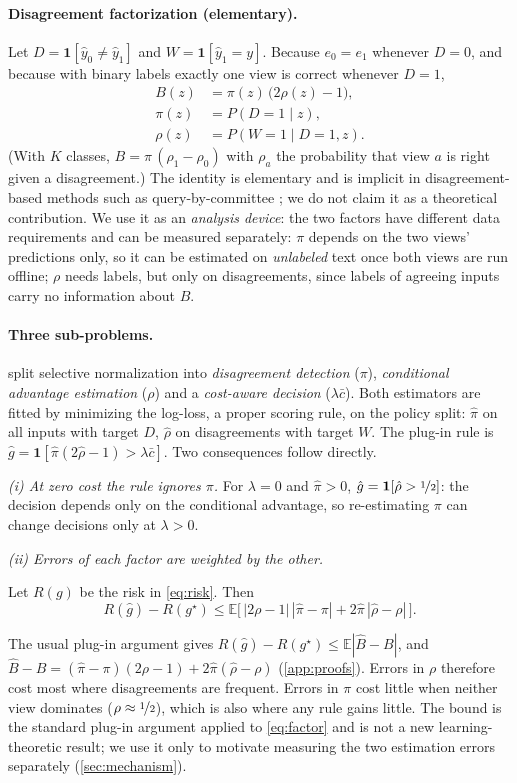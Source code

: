 \paragraph{Disagreement factorization (elementary).}
Let $D=\mathbf 1[\hat y_0\neq\hat y_1]$ and $W=\mathbf 1[\hat y_1=y]$.
Because $e_0=e_1$ whenever $D=0$, and because with binary labels exactly one view is correct whenever $D=1$,
\begin{align}
B(z)&=\pi(z)\,\big(2\rho(z)-1\big),\label{eq:factor}\\
\pi(z)&=P(D{=}1\mid z),\nonumber\\
\rho(z)&=P(W{=}1\mid D{=}1,z).\nonumber
\end{align}
(With $K$ classes, $B=\pi\,(\rho_1-\rho_0)$ with $\rho_a$ the probability that view $a$ is right given a disagreement.)
The identity is elementary and is implicit in disagreement-based methods such as query-by-committee \citep{seung1992qbc}; we do not claim it as a theoretical contribution. We use it as an \emph{analysis device}: the two factors have different data requirements and can be measured separately:
$\pi$ depends on the two views' predictions only, so it can be estimated on \emph{unlabeled} text once both views are run offline;
$\rho$ needs labels, but only on disagreements, since labels of agreeing inputs carry no information about $B$.

\paragraph{Three sub-problems.}
 split selective normalization into \emph{disagreement detection} ($\pi$), \emph{conditional advantage estimation} ($\rho$) and a \emph{cost-aware decision} ($\lambda\bar c$). Both estimators are fitted by minimizing the log-loss, a proper scoring rule, on the policy split: $\hat\pi$ on all inputs with target $D$, $\hat\rho$ on disagreements with target $W$. The plug-in rule is $\hat g=\mathbf 1[\hat\pi(2\hat\rho-1)>\lambda\bar c]$. Two consequences follow directly.

\emph{(i) At zero cost the rule ignores $\pi$.} For $\lambda=0$ and $\hat\pi>0$, $\hat g=\mathbf 1[\hat\rho>\nicefrac12]$: the decision depends only on the conditional advantage, so re-estimating $\pi$ can change decisions only at $\lambda>0$.

\emph{(ii) Errors of each factor are weighted by the other.}
\begin{proposition}
\label{prop:regret}
Let $R(g)$ be the risk in \cref{eq:risk}. Then
\[
R(\hat g)-R(g^\star)\le\mathbb E\big[\,|2\rho-1|\,|\hat\pi-\pi|+2\hat\pi\,|\hat\rho-\rho|\,\big].
\]
\end{proposition}
The usual plug-in argument gives $R(\hat g)-R(g^\star)\le\mathbb E|\hat B-B|$, and $\hat B-B=(\hat\pi-\pi)(2\rho-1)+2\hat\pi(\hat\rho-\rho)$ (\cref{app:proofs}). Errors in $\rho$ therefore cost most where disagreements are frequent. Errors in $\pi$ cost little when neither view dominates ($\rho\approx\nicefrac12$), which is also where any rule gains little. The bound is the standard plug-in argument applied to \cref{eq:factor} and is not a new learning-theoretic result; we use it only to motivate measuring the two estimation errors separately (\cref{sec:mechanism}).

